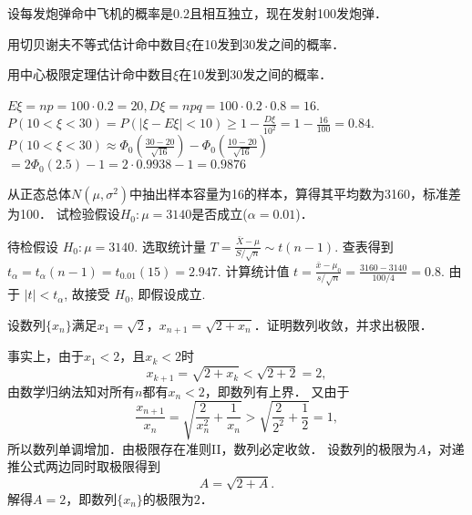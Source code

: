 \documentclass{jnuexam}
\begin{document}
\vfill

\newpage %

\begin{problem}
设每发炮弹命中飞机的概率是0.2且相互独立，现在发射100发炮弹．\par
\step 用切贝谢夫不等式估计命中数目$\xi$在10发到30发之间的概率．\par
\step 用中心极限定理估计命中数目$\xi$在10发到30发之间的概率．
\end{problem}

\bigskip

\begin{solution}
$E\xi = n p = 100 \cdot 0.2 = 20, D\xi = n p q = 100 \cdot 0.2 \cdot 0.8 = 16$. 
\step $P (10 < \xi < 30) = P (| \xi - E \xi | < 10) \ge 1 - \frac{D\xi}{10^2}
     = 1 - \frac{16}{100} = 0.84$. 
\step $P (10 < \xi < 30) \approx \Phi_0 \left( \frac{30 - 20}{\sqrt{16}}\right)
     - \Phi_0 \left( \frac{10 - 20}{\sqrt{16}} \right)$ 
\qquad $= 2 \Phi_0 (2.5) - 1 = 2 \cdot 0.9938 - 1 =0.9876$ 
\end{solution}

\vfill

\begin{problem}
从正态总体$N(\mu,\sigma^2)$中抽出样本容量为16的样本，算得其平均数为3160，标准差为100．
试检验假设$H_0:\mu=3140$是否成立($\alpha = 0.01$)．
\end{problem}

\bigskip

\begin{solution}
\step 待检假设 $H_0 : \mu = 3140$. 
\step 选取统计量 $T = \frac{\bar{X}-\mu}{S / \sqrt{n}} \sim t(n-1)$. 
\step 查表得到 $t_{\alpha} = t_{\alpha} (n - 1) = t_{0.01} (15) =2.947$. 
\step 计算统计值 $t = \frac{\bar{x} - \mu_0}{s/\sqrt{n}} =\frac{3160-3140}{100/4} = 0.8$.
\step 由于 $| t | < t_{\alpha}$, 故接受 $H_0$, 即假设成立. 
\end{solution}

\vfill

\newpagea %


\begin{problem}
设数列$\{x_n\}$满足$x_1=\sqrt2$，$x_{n+1}=\sqrt{2+x_n}$．证明数列收敛，并求出极限．
\end{problem}

\bigskip

\begin{solution}
\step 事实上，由于$x_1<2$，且$x_k<2$时
$$x_{k+1}=\sqrt{2+x_k}<\sqrt{2+2}=2,$$
由数学归纳法知对所有$n$都有$x_n<2$，即数列有上界．
又由于
$$\frac{x_{n+1}}{x_n}=\sqrt{\frac{2}{x_n^2}+\frac{1}{x_n}}>\sqrt{\frac{2}{2^2}+\frac{1}{2}}=1,$$
所以数列单调增加．由极限存在准则II，数列必定收敛．
\step 设数列的极限为$A$，对递推公式两边同时取极限得到
$$A=\sqrt{2+A}.$$
解得$A=2$，即数列$\{x_n\}$的极限为$2$．
\end{solution}
\end{document}
